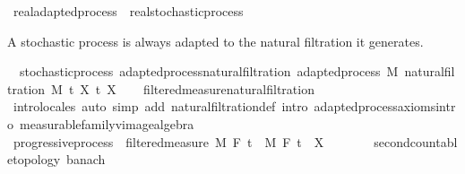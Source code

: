 \begin{isabellebody}
\ real{\isacharunderscore}{\kern0pt}adapted{\isacharunderscore}{\kern0pt}process\ {\isasymsubseteq}\ real{\isacharunderscore}{\kern0pt}stochastic{\isacharunderscore}{\kern0pt}process%
\isadelimproof
\ %
\endisadelimproof
%
\isatagproof
\isacommand{{\isachardot}{\kern0pt}{\isachardot}{\kern0pt}}\isamarkupfalse%
%
\endisatagproof
{\isafoldproof}%
%
\isadelimproof
%
\endisadelimproof
%
\begin{isamarkuptext}%
A stochastic process is always adapted to the natural filtration it generates.%
\end{isamarkuptext}\isamarkuptrue%
\isamarkupfalse%
\ {\isacharparenleft}{\kern0pt}\ stochastic{\isacharunderscore}{\kern0pt}process{\isacharparenright}{\kern0pt}\ adapted{\isacharunderscore}{\kern0pt}process{\isacharunderscore}{\kern0pt}natural{\isacharunderscore}{\kern0pt}filtration{\isacharcolon}{\kern0pt}\ {\isachardoublequoteopen}adapted{\isacharunderscore}{\kern0pt}process\ M\ {\isacharparenleft}{\kern0pt}natural{\isacharunderscore}{\kern0pt}filtration\ M\ t\ X{\isacharparenright}{\kern0pt}\ t\ X{\isachardoublequoteclose}\isanewline
%
\isadelimproof
\ \ %
\endisadelimproof
%
\isatagproof
{}\isamarkupfalse%
\ filtered{\isacharunderscore}{\kern0pt}measure{\isacharunderscore}{\kern0pt}natural{\isacharunderscore}{\kern0pt}filtration\isanewline
\ \ \isamarkupfalse%
\ {\isacharparenleft}{\kern0pt}intro{\isacharunderscore}{\kern0pt}locales{\isacharparenright}{\kern0pt}\ {\isacharparenleft}{\kern0pt}auto\ simp\ add{\isacharcolon}{\kern0pt}\ natural{\isacharunderscore}{\kern0pt}filtration{\isacharunderscore}{\kern0pt}def\ intro{\isacharbang}{\kern0pt}{\isacharcolon}{\kern0pt}\ adapted{\isacharunderscore}{\kern0pt}process{\isacharunderscore}{\kern0pt}axioms{\isachardot}{\kern0pt}intro\ measurable{\isacharunderscore}{\kern0pt}family{\isacharunderscore}{\kern0pt}vimage{\isacharunderscore}{\kern0pt}algebra{\isacharparenright}{\kern0pt}%
\endisatagproof
{\isafoldproof}%
%
\isadelimproof
%
\endisadelimproof
%
\isadelimdocument
%
\endisadelimdocument
%
\isatagdocument
%
\isamarkuptrue%
%
\endisatagdocument
{\isafolddocument}%
%
\isadelimdocument
%
\endisadelimdocument
{}\isamarkupfalse%
\ progressive{\isacharunderscore}{\kern0pt}process\ {\isacharequal}{\kern0pt}\ filtered{\isacharunderscore}{\kern0pt}measure\ M\ F\ t\ \ M\ F\ t\ \ X\ {\isacharcolon}{\kern0pt}{\isacharcolon}{\kern0pt}\ {\isachardoublequoteopen}{\isacharunderscore}{\kern0pt}\ {\isasymRightarrow}\ {\isacharunderscore}{\kern0pt}\ {\isasymRightarrow}\ {\isacharunderscore}{\kern0pt}\ {\isacharcolon}{\kern0pt}{\isacharcolon}{\kern0pt}\ {\isacharbraceleft}{\kern0pt}second{\isacharunderscore}{\kern0pt}countable{\isacharunderscore}{\kern0pt}topology{\isacharcomma}{\kern0pt}\ banach{\isacharbraceright}{\kern0pt}{\isachardoublequoteclose}\ {\isacharplus}{\kern0pt}\isanewline

\end{isabellebody}
